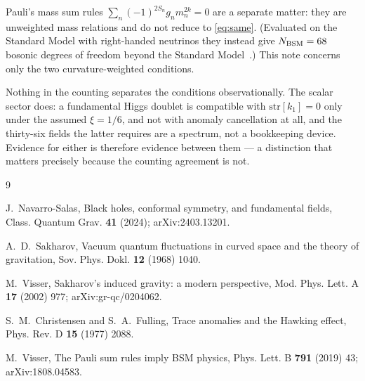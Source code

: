 \documentclass[aps,prd,twocolumn,superscriptaddress,nofootinbib,10pt]{revtex4-2}
\begin{document}
Pauli's mass sum rules $\sum_n (-1)^{2S_n} g_n m_n^{2k} = 0$ are a separate matter: they are
unweighted mass relations and do not reduce to \eqref{eq:same}. (Evaluated on the Standard Model
with right-handed neutrinos they instead give $N_{\rm BSM} = 68$ bosonic degrees of freedom beyond
the Standard Model~\cite{Visser2019}.) This note concerns only the two curvature-weighted
conditions.

Nothing in the counting separates the conditions observationally. The scalar sector does: a
fundamental Higgs doublet is compatible with $\mathrm{str}[k_1] = 0$ only under the assumed
$\xi = 1/6$, and not with anomaly cancellation at all, and the thirty-six fields the latter
requires are a spectrum, not a bookkeeping device. Evidence for either is therefore evidence
between them --- a distinction that matters precisely because the counting agreement is not.

\begin{thebibliography}{9}

J.~Navarro-Salas,
\newblock Black holes, conformal symmetry, and fundamental fields,
\newblock Class. Quantum Grav. \textbf{41} (2024); arXiv:2403.13201.

A.~D.~Sakharov,
\newblock Vacuum quantum fluctuations in curved space and the theory of gravitation,
\newblock Sov. Phys. Dokl. \textbf{12} (1968) 1040.

M.~Visser,
\newblock Sakharov's induced gravity: a modern perspective,
\newblock Mod. Phys. Lett. A \textbf{17} (2002) 977; arXiv:gr-qc/0204062.

S.~M.~Christensen and S.~A.~Fulling,
\newblock Trace anomalies and the Hawking effect,
\newblock Phys. Rev. D \textbf{15} (1977) 2088.

M.~Visser,
\newblock The Pauli sum rules imply BSM physics,
\newblock Phys. Lett. B \textbf{791} (2019) 43; arXiv:1808.04583.

\end{thebibliography}
\end{document}
